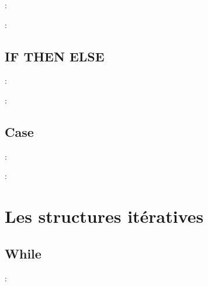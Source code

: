 \documentclass[10pt]{beamer}
\begin{document}
\begin{frame}{\secname : \subsecname}
    
\end{frame}

\begin{frame}{\secname : \subsecname}
    
\end{frame}

\subsection{IF THEN ELSE}
\begin{frame}{\secname : \subsecname}
    
\end{frame}

\begin{frame}{\secname : \subsecname}
    
\end{frame}

\subsection{Case}
\begin{frame}{\secname : \subsecname}
    
\end{frame}

\begin{frame}{\secname : \subsecname}
    
\end{frame}

\section{Les structures itératives}
\tocss
\subsection{While}
\begin{frame}{\secname : \subsecname}
    
\end{frame}
\end{document}
